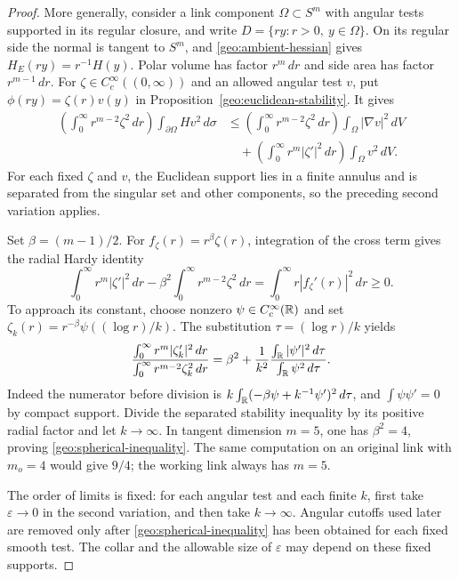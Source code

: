 \begin{proof}
More generally, consider a link component $\Omega\subset S^m$ with
angular tests supported in its regular closure, and write
$D=\{ry:r>0,\ y\in\Omega\}$.
On its regular side the normal is tangent to $S^m$, and
\eqref{geo:ambient-hessian} gives $H_E(ry)=r^{-1}H(y)$.
Polar volume has factor $r^m\,dr$ and side area has factor
$r^{m-1}\,dr$.
For $\zeta\in C_c^\infty((0,\infty))$ and an allowed angular test $v$,
put $\phi(ry)=\zeta(r)v(y)$ in
Proposition~\ref{geo:euclidean-stability}. It gives
\begin{align*}
 \left(\int_0^\infty r^{m-2}\zeta^2\,dr\right)
       \int_{\partial\Omega}Hv^2\,d\sigma
 &\le
 \left(\int_0^\infty r^{m-2}\zeta^2\,dr\right)
       \int_\Omega|\nabla v|^2\,dV\\
 &\quad+
 \left(\int_0^\infty r^m|\zeta'|^2\,dr\right)
       \int_\Omega v^2\,dV.
\end{align*}
For each fixed $\zeta$ and $v$, the Euclidean support lies in a finite
annulus and is separated from the singular set and other components,
so the preceding second variation applies.

Set $\beta=(m-1)/2$. For $f_\zeta(r)=r^\beta\zeta(r)$, integration of
the cross term gives the radial Hardy identity
\[
 \int_0^\infty r^m|\zeta'|^2\,dr
  -\beta^2\int_0^\infty r^{m-2}\zeta^2\,dr
 =\int_0^\infty r|f_\zeta'(r)|^2\,dr\ge0.
\]
To approach its constant, choose nonzero
$\psi\in C_c^\infty(\mathbb R)$ and set
$\zeta_k(r)=r^{-\beta}\psi((\log r)/k)$.
The substitution $\tau=(\log r)/k$ yields
\begin{equation}\label{geo:hardy-limit}
 \frac{\int_0^\infty r^m|\zeta_k'|^2\,dr}
      {\int_0^\infty r^{m-2}\zeta_k^2\,dr}
 =\beta^2+\frac1{k^2}
          \frac{\int_\mathbb R|\psi'|^2\,d\tau}
               {\int_\mathbb R\psi^2\,d\tau}.
\end{equation}
Indeed the numerator before division is
$k\int_\mathbb R(-\beta\psi+k^{-1}\psi')^2\,d\tau$, and
$\int\psi\psi'=0$ by compact support.
Divide the separated stability inequality by its positive radial
factor and let $k\to\infty$. In tangent dimension $m=5$, one has
$\beta^2=4$, proving \eqref{geo:spherical-inequality}.
The same computation on an original link with $m_o=4$ would give
$9/4$; the working link always has $m=5$.

The order of limits is fixed: for each angular test and each finite
$k$, first take $\varepsilon\to0$ in the second variation, and then
take $k\to\infty$. Angular cutoffs used later are removed only after
\eqref{geo:spherical-inequality} has been obtained for each fixed
smooth test. The collar and the allowable size of $\varepsilon$ may
depend on these fixed supports.
\end{proof}
